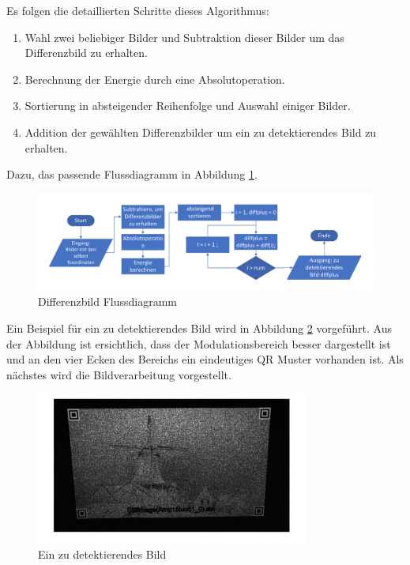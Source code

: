 Es folgen die detaillierten Schritte dieses Algorithmus:

\begin{enumerate}
	\item Wahl zwei beliebiger Bilder und Subtraktion dieser Bilder um das Differenzbild zu erhalten.
	\item Berechnung der Energie durch eine Absolutoperation.
	\item Sortierung in absteigender Reihenfolge und Auswahl einiger Bilder.
	\item Addition der gewählten Differenzbilder um ein zu detektierendes Bild zu erhalten.
\end{enumerate}

Dazu, das passende Flussdiagramm in Abbildung \ref{fig:DifferenzbildFlussigdiagramm}.
\begin{figure}[H]
 \centering 
 \includegraphics[keepaspectratio,width=1.1\textwidth]{images/3_Ersteverfahren/Differenzbild/Differenzbildflussigdiagramm.pdf}
 \caption{Differenzbild Flussdiagramm}
 \label{fig:DifferenzbildFlussigdiagramm}
\end{figure} 

Ein Beispiel für ein zu detektierendes Bild wird in Abbildung \ref{fig:EindetektiertesBild} vorgeführt. Aus der Abbildung ist ersichtlich, dass der Modulationsbereich besser dargestellt ist und an den vier Ecken des Bereichs ein eindeutiges QR Muster vorhanden ist. Als nächstes wird die Bildverarbeitung vorgestellt.

\begin{figure}[H]
 \centering 
 \includegraphics[keepaspectratio,width=0.8\textwidth]{images/3_Ersteverfahren/Differenzbild/diffplus.pdf}
 \caption{Ein zu detektierendes Bild}
 \label{fig:EindetektiertesBild}
\end{figure} 


